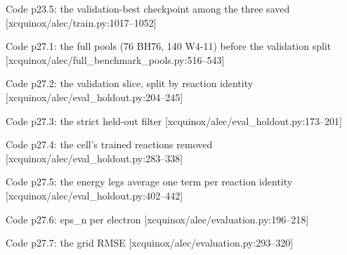 \begin{frame}[allowframebreaks]{Code p23.5: the validation-best checkpoint among the three saved [xcquinox/alec/train.py:1017--1052]}
\label{code:p23_5_the_validation_best_checkpoint_among_the}
\end{frame}
\begin{frame}[allowframebreaks]{Code p27.1: the full pools (76 BH76, 140 W4-11) before the validation split [xcquinox/alec/full\_benchmark\_pools.py:516--543]}
\label{code:p27_1_the_full_pools_76_bh76_140_w4_11_before}
\end{frame}
\begin{frame}[allowframebreaks]{Code p27.2: the validation slice, split by reaction identity [xcquinox/alec/eval\_holdout.py:204--245]}
\label{code:p27_2_the_validation_slice_split_by_reaction_i}
\end{frame}
\begin{frame}[allowframebreaks]{Code p27.3: the strict held-out filter [xcquinox/alec/eval\_holdout.py:173--201]}
\label{code:p27_3_the_strict_held_out_filter}
\end{frame}
\begin{frame}[allowframebreaks]{Code p27.4: the cell's trained reactions removed [xcquinox/alec/eval\_holdout.py:283--338]}
\label{code:p27_4_the_cell_s_trained_reactions_removed}
\end{frame}
\begin{frame}[allowframebreaks]{Code p27.5: the energy legs average one term per reaction identity [xcquinox/alec/eval\_holdout.py:402--442]}
\label{code:p27_5_the_energy_legs_average_one_term_per_rea}
\end{frame}
\begin{frame}[allowframebreaks]{Code p27.6: eps\_n per electron [xcquinox/alec/evaluation.py:196--218]}
\label{code:p27_6_eps_n_per_electron}
\end{frame}
\begin{frame}[allowframebreaks]{Code p27.7: the grid RMSE [xcquinox/alec/evaluation.py:293--320]}
\label{code:p27_7_the_grid_rmse}
\end{frame}
